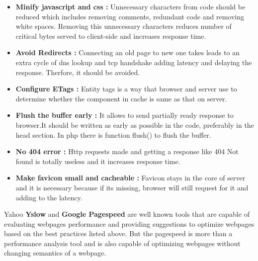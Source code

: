 \documentclass[conference]{IEEEtran}
\begin{document}
\begin{itemize}
\item \textbf{ Minify javascript and css :}
Unnecessary characters from code should be reduced which includes removing
comments, redundant code and removing white spaces. Removing this unnecessary
characters reduces number of critical bytes served to client-side and increases response time.

\item \textbf{Avoid Redirects :}
Connecting an old page to new one takes leads to an extra cycle of dns lookup and tcp handshake adding latency
and delaying the response. Therfore, it should be avoided.

\item \textbf{Configure ETags :}
Entity tags is a way that browser and server use to determine whether the
component in cache is same as that on server.

\item \textbf{Flush the buffer early :}
It allows to send partially ready response to browser.It should be written as
early as possible in the code, preferably in the head section.
In php there is function flush() to flush the buffer. 

\item \textbf{No 404 error :}
Http requests made and getting a response like 404 Not found is totally useless
and it increases response time.

\item \textbf{Make favicon small and cacheable :}
Favicon stays in the core of server and  it is necessary because if its missing,
browser will still request for it and adding to the latency.
\end{itemize}

Yahoo {\bf Yslow} and {\bf Google Pagespeed} are well known tools that are capable of
evaluating webpages performance and providing suggestions to optimize webpages
based on the best practices listed above. But the pagespeed is more than a performance analysis
tool and is also capable of optimizing webpages without changing semantics of a webpage.
\end{document}
